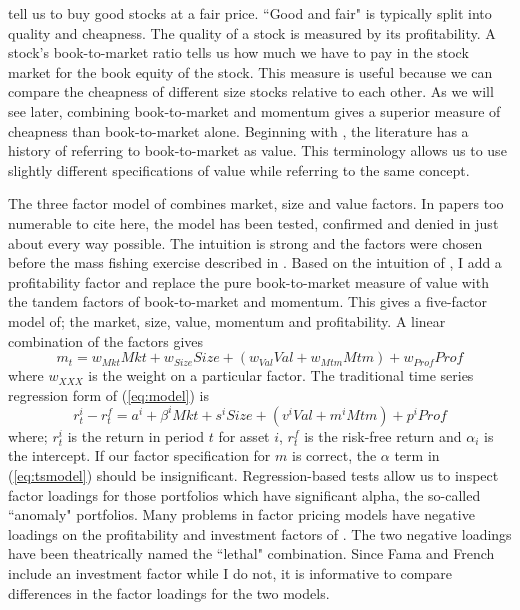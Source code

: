 \textcite{graham1934security} tell us to buy good stocks at a fair price.
``Good and fair" is typically split into quality and cheapness.
The quality of a stock is measured by its profitability.
A stock's book-to-market ratio tells us how much we have to pay in the stock market for the 
book equity of the stock.
This measure is useful because we can compare the cheapness of different size stocks relative 
to each other.
As we will see later, combining book-to-market and momentum gives a superior measure of 
cheapness than book-to-market alone.
Beginning with \textcite{fama1992cross}, the literature has a history of referring to 
book-to-market as value.
This terminology allows us to use slightly different specifications of value while referring 
to the same concept.

The three factor model of \textcite{fama1993common} combines market, size and value factors.
In papers too numerable to cite here, the model has been tested, confirmed and denied in just 
about every way possible.
The intuition is strong and the factors were chosen before the mass fishing exercise described 
in \textcite{harvey2016and}.
Based on the intuition of \textcite{graham1934security}, I add a profitability factor and 
replace the pure book-to-market measure of value with the tandem factors of book-to-market and 
momentum.
This gives a five-factor model of; the market, size, value, momentum and profitability. A 
linear combination of the factors gives
\begin{equation}
\label{eq:model}
m_t= w_{Mkt}Mkt + w_{Size}Size + \left( w_{Val}Val + w_{Mtm}Mtm \right) + w_{Prof}Prof
\end{equation}
where $w_{XXX}$ is the weight on a particular factor.
The traditional time series regression form of (\ref{eq:model}) is
\begin{equation}
\label{eq:tsmodel}
r_t^i - r_t^f= a^i + \beta^i Mkt + s^iSize + \left( v^iVal + m^iMtm \right) + p^iProf
\end{equation}
where; $r_t^i$ is the return in period $t$ for asset $i$, $r_t^f$ is the risk-free return and 
$\alpha_i$ is the intercept.
If our factor specification for $m$ is correct, the $\alpha$ term in (\ref{eq:tsmodel}) should 
be insignificant.
Regression-based tests allow us to inspect factor loadings for those portfolios which have 
significant alpha, the so-called ``anomaly" portfolios.
Many problems in factor pricing models have negative loadings on the profitability and 
investment factors of \textcite{fama2016dissecting}.
The two negative loadings have been theatrically named the ``lethal" combination.
Since Fama and French include an investment factor while I do not, it is informative to 
compare differences in the factor loadings for the two models.

